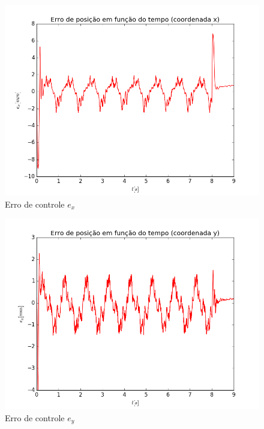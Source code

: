 \documentclass[]{politex}
\begin{document}
\begin{multicols}{2}
\begin{figure}[H]
	\centering
	\includegraphics[scale=0.39]{../../../Experimental/Aquisicoes/CTCx_circulo/ex.png}  
	\caption{Erro de controle $e_x$}
	\label{fig:CTCx_circulo_ex}
\end{figure}
\begin{figure}[H]
	\centering
	\includegraphics[scale=0.39]{../../../Experimental/Aquisicoes/CTCx_circulo/ey.png}  
	\caption{Erro de controle $e_y$}
	\label{fig:CTCx_circulo_ey}
\end{figure}
\end{multicols}
\end{document}
